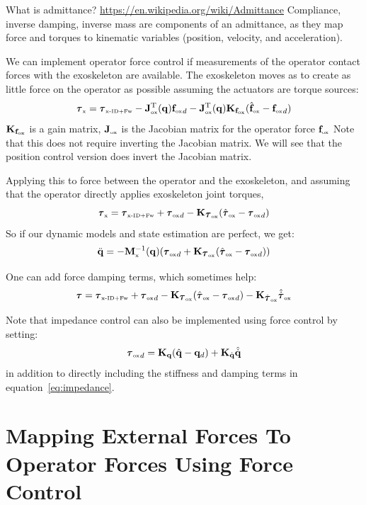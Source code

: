 \documentclass[letterpaper,12pt,fullpage]{article}
\newcommand{\myx}{{\mbox {\tiny x}}}
\newcommand{\ox}{{\mbox {\tiny ox}}}
\newcommand{\xinvdynw}{{\mbox {\tiny x-ID+Fw}}}
\begin{document}
What is admittance?
\url{https://en.wikipedia.org/wiki/Admittance}
Compliance, inverse damping, inverse mass are components of an admittance,
as they map force and torques to kinematic variables (position, velocity, and
acceleration). 

We can implement operator force control 
if measurements of the operator contact forces with
the exoskeleton are available.
The exoskeleton moves as to create as little force on the operator as possible 
assuming the actuators are torque sources:
\begin{equation}
\vtau_{\myx} = \vtau_{\xinvdynw} - \mJ_{\ox}^{\tr}(\vq) {\vf_{\ox}}_d
- \mJ_{\ox}^{\tr}(\vq) \mK_{\vf_{\ox}} ( \hat{\vf}_{\ox} - {\vf_{\ox}}_d )
\end{equation}
$\mK_{\vf_{\ox}}$ is a gain matrix, $\mJ_{\ox}$ is the Jacobian matrix for the operator
force $\vf_{\ox}$
Note that this does not require inverting the Jacobian matrix.
We will see that the position control version does invert the Jacobian matrix.

Applying this to force between the operator and the exoskeleton, and assuming
that the operator directly applies exoskeleton joint torques,
\begin{equation}
\vtau_{\myx} = \vtau_{\xinvdynw} + {\vtau_{\ox}}_d - \mK_{\vtau_{\ox}} ( \hat{\vtau}_{\ox} - {\vtau_{\ox}}_d )
\end{equation}
So if our dynamic models and state estimation are perfect, we get:
\begin{equation}
\ddot{\vq} = - \mM^{-1}_{\myx} (\vq) ({\vtau_{\ox}}_d + \mK_{\vtau_{\ox}} ( \hat{\vtau}_{\ox} - {\vtau_{\ox}}_d ))
\end{equation}

One can add force damping terms, which sometimes help:
\begin{equation}
\vtau = \vtau_{\xinvdynw} + {\vtau_{\ox}}_d - \mK_{\vtau_{\ox}} ( \hat{\vtau}_{\ox} - {\vtau_{\ox}}_d )
- \mK_{\dot{\vtau}_{\ox}} \hat{\dot{\vtau}}_{\ox}
\end{equation}

Note that impedance control can also be implemented using force control
by setting:
\begin{equation}
{\vtau_{\ox}}_d = \mK_{\vq}( \hat{\vq} - \vq_d ) + \mK_{\dot{\vq}} \hat{\dot{\vq}}
\end{equation}
in addition to directly including the stiffness and damping terms in
equation~\ref{eq:impedance}. 

\section{Mapping External Forces To Operator Forces Using Force Control}
\end{document}
